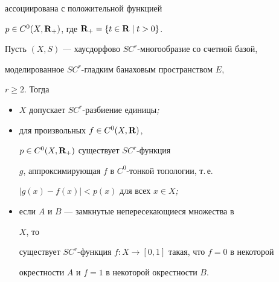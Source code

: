 ассоциирована с положительной функцией


$p\in C^0(X,\bold R_+)$, где $\bold R_+=\{t\in\bold R\mid t>0\}$.





\begin{thms}


Пусть $(X,S)$ --- хаусдорфово $SC^r$-многообразие со счетной базой,


моделированное $SC^r$-гладким банаховым пространством $E$,


$r\ge 2$. Тогда


\begin{itemize}


\item[а)] $X$ допускает $SC^r$-разбиение единицы{\em ;}


\item[б)] для произвольных $f\in C^0(X,\bold R)$,


$p\in C^0(X,\bold R_+)$ существует $SC^r$-функция


$g$, аппроксимирующая $f$ в $C^0$-тонкой топологии, т.\,е.


$|g(x)-f(x)|<p(x)$ для всех $x\in X${\em ;}


\item[в)] если $A$ и $B$ --- замкнутые непересекающиеся множества в


$X$, то


существует $SC^r$-функция $f:X\to[0,1]$ такая, что $f=0$ в некоторой


окрестности $A$ и $f=1$ в некоторой окрестности $B$.


\end{itemize}


\end{thms}





